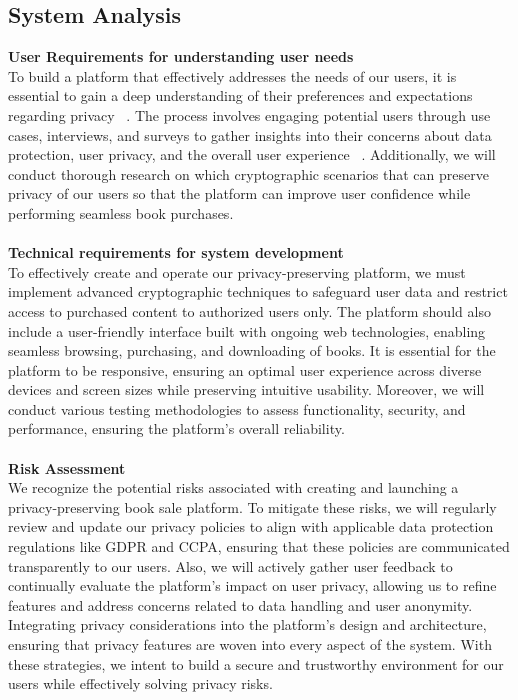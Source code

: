 \documentclass[12pt]{article}
\begin{document}
\subsection{System Analysis}
\textbf{User Requirements for understanding user needs}\\
To build a platform that effectively addresses the needs of our users, it is essential to gain a deep understanding of their preferences and expectations regarding privacy ~\cite{Han2011}. The process involves engaging potential users through use cases, interviews, and surveys to gather insights into their concerns about data protection, user privacy, and the overall user experience ~\cite{Han2011}. Additionally, we will conduct thorough research on which cryptographic scenarios that can preserve privacy of our users so that the platform can improve user confidence while performing seamless book purchases.\\\\
\textbf{Technical requirements for system development}\\
To effectively create and operate our privacy-preserving platform, we must implement advanced cryptographic techniques to safeguard user data and restrict access to purchased content to authorized users only. The platform should also include a user-friendly interface built with ongoing web technologies, enabling seamless browsing, purchasing, and downloading of books. It is essential for the platform to be responsive, ensuring an optimal user experience across diverse devices and screen sizes while preserving intuitive usability. Moreover, we will conduct various testing methodologies to assess functionality, security, and performance, ensuring the platform's overall reliability.\\\\
\textbf{Risk Assessment}\\
We recognize the potential risks associated with creating and launching a privacy-preserving book sale platform. To mitigate these risks, we will regularly review and update our privacy policies to align with applicable data protection regulations like GDPR and CCPA, ensuring that these policies are communicated transparently to our users. Also, we will actively gather user feedback to continually evaluate the platform's impact on user privacy, allowing us to refine features and address concerns related to data handling and user anonymity. Integrating privacy considerations into the platform's design and architecture, ensuring that privacy features are woven into every aspect of the system. With these strategies, we intent to build a secure and trustworthy environment for our users while effectively solving privacy risks.
\pagebreak
\end{document}

